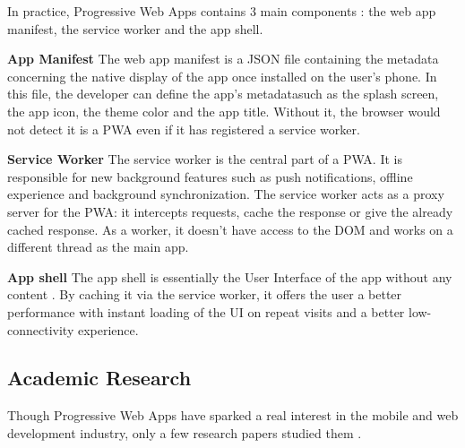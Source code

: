 \documentclass{kththesis}
\begin{document}
In practice, Progressive Web Apps contains 3 main components : the web app manifest, the service worker and the app shell.

\medskip
\textbf{App Manifest} \newline
The web app manifest is a JSON file containing the metadata concerning the native display of the app once installed on the user's phone. In this file, the developer can define the app's metadatasuch as the splash screen, the app icon, the theme color and the app title. Without it, the browser would not detect it is a PWA even if it has registered a service worker.

\medskip
\textbf{Service Worker} \newline
The service worker is the central part of a PWA. It is responsible for new background features such as push notifications, offline experience and background synchronization\cite{SW_def}. The service worker acts as a proxy server for the PWA: it intercepts requests, cache the response or give the already cached response. As a worker, it doesn't have access to the DOM and works on a different thread as the main app. 

\medskip
\textbf{App shell} \newline
The app shell is essentially the User Interface of the app without any content \cite{AppShell_def}. By caching it via the service worker, it offers the user a better performance with instant loading of the UI on repeat visits and a better low-connectivity experience.


\subsection{Academic Research} 


Though Progressive Web Apps have sparked a real interest in the mobile and web development industry, only a few research papers studied them\cite{PWApossibleUnifer} \cite{Biorn-Hansen2} \cite{Biorn-Hansen3}.
\end{document}
